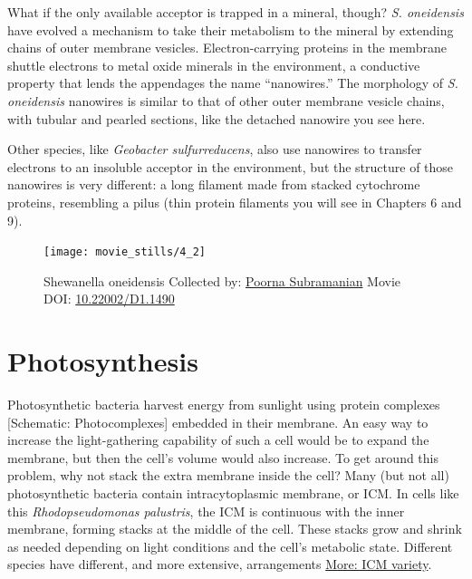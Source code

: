 \documentclass[]{tufte-book}
\begin{document}
What if the only available acceptor is trapped in a mineral, though?
\emph{S. oneidensis} have evolved a mechanism to take their metabolism
to the mineral by extending chains of outer membrane vesicles.
Electron-carrying proteins in the membrane shuttle electrons to metal
oxide minerals in the environment, a conductive property that lends the
appendages the name ``nanowires.'' The morphology of \emph{S.
oneidensis} nanowires is similar to that of other outer membrane vesicle
chains, with tubular and pearled sections, like the detached nanowire
you see here.

Other species, like \emph{Geobacter sulfurreducens}, also use nanowires
to transfer electrons to an insoluble acceptor in the environment, but
the structure of those nanowires is very different: a long filament made
from stacked cytochrome proteins, resembling a pilus (thin protein
filaments you will see in Chapters 6 and 9).





\begin{figure}
\texttt{[image: movie\_stills/4\_2]} \caption[Shewanella oneidensis Collected by:
\protect\hyperlink{poorna_subramanian}{Poorna Subramanian} Movie DOI:
\href{https://doi.org/10.22002/D1.1490}{10.22002/D1.1490}]{Shewanella oneidensis Collected by:
\protect\hyperlink{poorna_subramanian}{Poorna Subramanian} Movie DOI:
\href{https://doi.org/10.22002/D1.1490}{10.22002/D1.1490}}\label{fig:4-2}
\end{figure}

\section{Photosynthesis}\label{photosynthesis}

Photosynthetic bacteria harvest energy from sunlight using protein
complexes {[}Schematic: Photocomplexes{]} embedded in their membrane. An
easy way to increase the light-gathering capability of such a cell would
be to expand the membrane, but then the cell's volume would also
increase. To get around this problem, why not stack the extra membrane
inside the cell? Many (but not all) photosynthetic bacteria contain
intracytoplasmic membrane, or ICM. In cells like this
\emph{Rhodopseudomonas palustris}, the ICM is continuous with the inner
membrane, forming stacks at the middle of the cell. These stacks grow
and shrink as needed depending on light conditions and the cell's
metabolic state. Different species have different, and more extensive,
arrangements \protect\hyperlink{ICM_variety}{More: ICM variety}.
\end{document}
